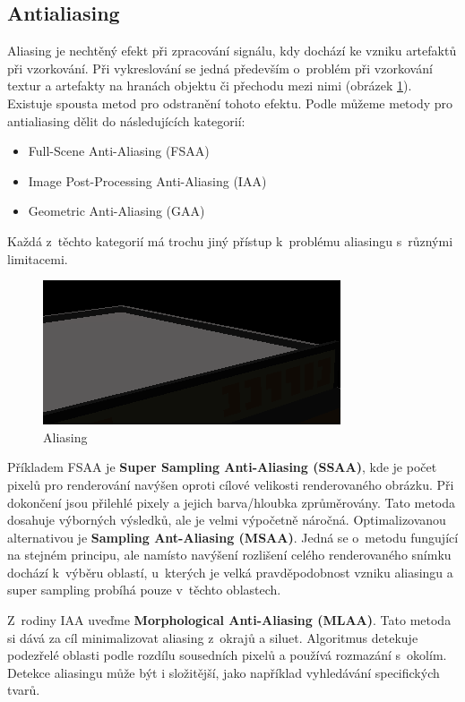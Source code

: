 \subsection{Antialiasing}
Aliasing je nechtěný efekt při zpracování signálu, kdy dochází ke vzniku artefaktů při vzorkování. Při vykreslování se jedná především o~problém při vzorkování textur a artefakty na hranách objektu či přechodu mezi nimi (obrázek \ref{fig:aliasing}). Existuje spousta metod pro odstranění tohoto efektu. Podle \cite{aa_survey} můžeme metody pro antialiasing dělit do následujících kategorií:

\begin{itemize}
	\item Full-Scene Anti-Aliasing (FSAA)
	\item Image Post-Processing Anti-Aliasing (IAA)
	\item Geometric Anti-Aliasing (GAA)
\end{itemize}

Každá z~těchto kategorií má trochu jiný přístup k~problému aliasingu s~různými limitacemi.

\begin{figure}[H]
	\centering
	\includegraphics[scale=2]{obrazky-figures/aliasing.png}
	\caption{Aliasing}
	\label{fig:aliasing}
\end{figure}

Příkladem FSAA je \textbf{Super Sampling Anti-Aliasing (SSAA)}, kde je počet pixelů pro renderování navýšen oproti cílové velikosti renderovaného obrázku. Při dokončení jsou přilehlé pixely a jejich barva/hloubka zprůměrovány. Tato metoda dosahuje výborných výsledků, ale je velmi výpočetně náročná. Optimalizovanou alternativou je \textbf{Sampling Ant-Aliasing (MSAA)}. Jedná se o~metodu fungující na stejném principu, ale namísto navýšení rozlišení celého renderovaného snímku dochází k~výběru oblastí, u~kterých je velká pravděpodobnost vzniku aliasingu a super sampling probíhá pouze v~těchto oblastech.

Z~rodiny IAA uveďme\textbf{ Morphological Anti-Aliasing (MLAA)}. Tato metoda si dává za cíl minimalizovat aliasing z~okrajů a siluet. Algoritmus detekuje podezřelé oblasti podle rozdílu sousedních pixelů a používá rozmazání s~okolím. Detekce aliasingu může být i složitější, jako například vyhledávání specifických tvarů.


